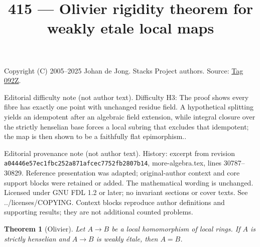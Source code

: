 \documentclass{amsart}
\theoremstyle{plain}
\newtheorem{theorem}[subsection]{Theorem}
\theoremstyle{definition}
\theoremstyle{remark}
\numberwithin{equation}{subsection}
\begin{document}
\title[Stacks Project, Tag 092Z]{415 --- Olivier rigidity theorem for weakly etale local maps}
\maketitle
\noindent Copyright (C) 2005--2025 Johan de Jong. Stacks Project authors. Source: \href{https://stacks.math.columbia.edu/tag/092Z}{Tag 092Z}.

\noindent Editorial difficulty note (not author text). Difficulty H3: The proof shows every fibre has exactly one point with unchanged residue field. A hypothetical splitting yields an idempotent after an algebraic field extension, while integral closure over the strictly henselian base forces a local subring that excludes that idempotent; the map is then shown to be a faithfully flat epimorphism..

\noindent Editorial provenance note (not author text). History: excerpt from revision \texttt{a0444\allowbreak 6e57e\allowbreak c1fbc\allowbreak 252a8\allowbreak 71afc\allowbreak ec775\allowbreak 2fb28\allowbreak 07b14}, more-algebra.tex, lines 30787--30829. Reference presentation was adapted; original-author context and core support blocks were retained or added. The mathematical wording is unchanged. Licensed under GNU FDL 1.2 or later; no invariant sections or cover texts. See ../licenses/COPYING. Context blocks reproduce author definitions and supporting results; they are not additional counted problems.

\begin{theorem}[Olivier]
\label{theorem-olivier}
Let $A \to B$ be a local homomorphism of local rings.
If $A$ is strictly henselian and $A \to B$ is weakly \'etale, then
$A = B$.
\end{theorem}
\end{document}
